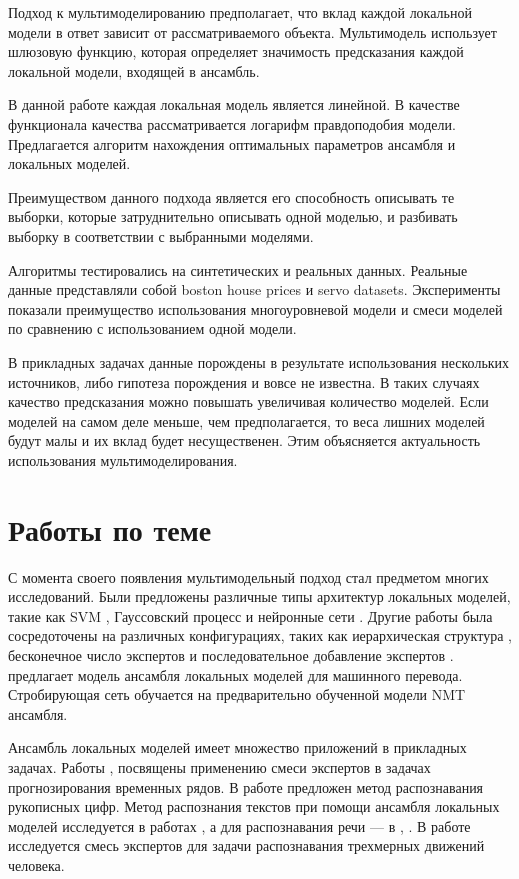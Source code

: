 \documentclass[12pt, twoside]{article}
\begin{document}
Подход к мультимоделированию предполагает, что вклад каждой локальной модели в ответ зависит от рассматриваемого объекта. Мультимодель использует шлюзовую функцию, которая определяет значимость предсказания каждой локальной модели, входящей в ансамбль.

В данной работе каждая локальная модель является линейной. В качестве функционала качества рассматривается логарифм правдоподобия модели. Предлагается алгоритм нахождения оптимальных параметров ансамбля и локальных моделей. 

Преимуществом данного подхода является его способность описывать те выборки, которые затруднительно описывать одной моделью, и разбивать выборку в соответствии с выбранными моделями.

Алгоритмы тестировались на синтетических и реальных данных. Реальные данные представляли собой boston house prices и servo datasets. Эксперименты показали преимущество использования многоуровневой модели и смеси моделей по сравнению с использованием одной модели.


В прикладных задачах данные порождены в результате использования нескольких источников, либо гипотеза порождения и вовсе не известна. В таких случаях качество предсказания можно повышать увеличивая количество моделей. Если моделей на самом деле меньше, чем предполагается, то веса лишних моделей будут малы и их вклад
будет несущественен. Этим объясняется актуальность использования мультимоделирования.

\section{Работы по теме}

С момента своего появления мультимодельный подход стал предметом многих исследований. Были предложены различные типы архитектур локальных моделей, такие как SVM \cite{Collobert2002}, Гауссовский процесс \cite{Tresp01mixturesof}  и нейронные сети \cite{Shazeer2017}. Другие работы была сосредоточены на различных конфигурациях, таких как иерархическая структура \cite{NIPS1991_514}, бесконечное число экспертов \cite{Rasmussen} и последовательное добавление экспертов \cite{Aljundi2016}. \cite{garmash-monz-2016-ensemble} предлагает модель ансамбля локальных моделей для машинного перевода. Стробирующая сеть обучается на предварительно обученной модели NMT ансамбля. 

Ансамбль локальных моделей имеет множество приложений в прикладных задачах. Работы \cite{Yumlu2003}, \cite{Cheung1995}\cite{Weigend2000} посвящены применению смеси экспертов в задачах прогнозирования временных
рядов. В работе \cite{article} предложен метод распознавания рукописных цифр. Метод распознания текстов при помощи ансамбля локальных моделей исследуется в работах \cite{Estabrooks2001}, а для распознавания речи --- в \cite{Mossavat2010}, \cite{Peng1996}. В работе \cite{Sminchisescu2007} исследуется смесь экспертов для задачи распознавания трехмерных движений человека.

 


\end{document}
